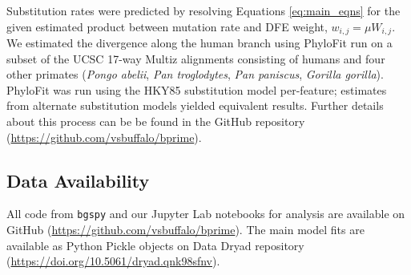\documentclass[11pt]{article}
\begin{document}
Substitution rates were predicted by resolving Equations \eqref{eq:main_eqns} for the given estimated product between mutation rate and DFE weight, $w_{i,j} = \mu W_{i,j}$. We estimated the divergence along the human branch using PhyloFit
\parencite{Siepel2004-ql} run on a subset of the UCSC 17-way Multiz alignments
\parencite{Blanchette2004-bb} consisting of humans and four other primates (\emph{Pongo
abelii}, \emph{Pan troglodytes}, \emph{Pan paniscus}, \emph{Gorilla gorilla}).
PhyloFit was run using the HKY85 substitution model per-feature; estimates from
alternate substitution models yielded equivalent results. Further details about
this process can be be found in the GitHub repository
(\url{https://github.com/vsbuffalo/bprime}). 
\subsection*{Data Availability}

All code from \texttt{bgspy} and our Jupyter Lab \parencite{Kluyver_undated-ol}
notebooks for analysis are available on GitHub
(\url{https://github.com/vsbuffalo/bprime}). The main model fits are available
as Python Pickle objects on Data Dryad repository (\url{https://doi.org/10.5061/dryad.qnk98sfnv}).

\printbibliography
\end{document}

